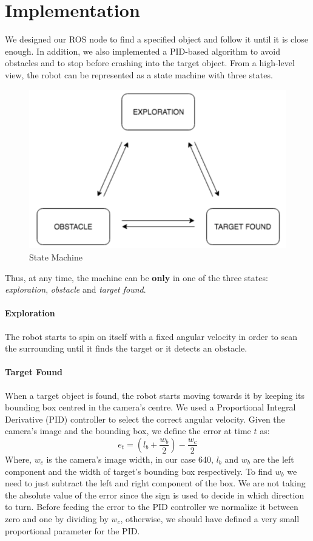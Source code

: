 \documentclass[letterpaper, 10 pt, conference]{ieeeconf}  %
\begin{document}
\section{Implementation}
We designed our ROS node to find a specified object and follow it until it is close enough. In addition, we also implemented a PID-based algorithm to avoid obstacles and to stop before crashing into the target object. From a high-level view, the robot can be represented as a state machine with three states.
\begin{figure}[H]
\centering
\includegraphics[width=\linewidth]{images/state}
\caption{State Machine}
\end{figure}
Thus, at any time, the machine can be \textbf{only} in one of the three states: \emph{exploration}, \emph{obstacle} and \emph{target found}. 

\paragraph{Exploration} The robot starts to spin on itself with a fixed angular velocity in order to scan the surrounding until it finds the target or it detects an obstacle.
\paragraph{Target Found} When a target object is found, the robot starts moving towards it by keeping its bounding box centred in the camera's centre. We used a Proportional Integral Derivative (PID) controller to select the correct angular velocity. Given the camera's image and the bounding box, we define the error at time $t$ as:
\begin{equation}
e_t =  (l_b + \frac{w_b}{2}) - \frac{w_c}{2}
\end{equation}
Where, $w_c$ is the camera's image width, in our case 640, $l_b$ and $w_b$ are the left component and the width of target's bounding box respectively. To find $w_b$ we need to just subtract the left and right component of the box. We are not taking the absolute value of the error since the sign is used to decide in which direction to turn. Before feeding the error to the PID controller we normalize it between zero and one by dividing by $w_c$, otherwise, we should have defined a very small proportional parameter for the PID. 
\end{document}
